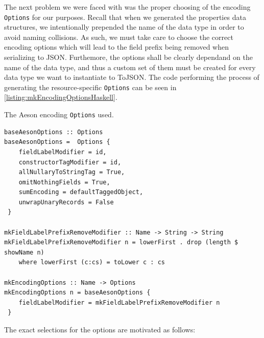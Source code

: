 \documentclass[11pt]{report}
\begin{document}
The next problem we were faced with was the proper choosing of the encoding
\texttt{Options} for our purposes. Recall that when we generated the properties
data structures, we intentionally prepended the name of the data type in order to
avoid naming collisions. As such, we must take care to choose the correct
encoding options which will lead to the field prefix being removed
when serializing to JSON\@. Furthemore, the options shall be clearly dependand on
the name of the data type, and thus a custom set of them must be created for
every data type we want to instantiate to ToJSON\@. The code performing the
process of generating the resource-specific \texttt{Options} can be seen in
\autoref{listing:mkEncodingOptionsHaskell}.

\begin{listing}[H]
    \caption{The Aeson encoding \texttt{Options} used.}
\label{listing:mkEncodingOptionsHaskell}
\begin{verbatim}
baseAesonOptions :: Options
baseAesonOptions =  Options {
    fieldLabelModifier = id,
    constructorTagModifier = id,
    allNullaryToStringTag = True,
    omitNothingFields = True,
    sumEncoding = defaultTaggedObject,
    unwrapUnaryRecords = False
 }

mkFieldLabelPrefixRemoveModifier :: Name -> String -> String
mkFieldLabelPrefixRemoveModifier n = lowerFirst . drop (length $ showName n)
    where lowerFirst (c:cs) = toLower c : cs

mkEncodingOptions :: Name -> Options
mkEncodingOptions n = baseAesonOptions {
    fieldLabelModifier = mkFieldLabelPrefixRemoveModifier n
 }
\end{verbatim}
\end{listing}

The exact selections for the options are motivated as follows:
\end{document}
